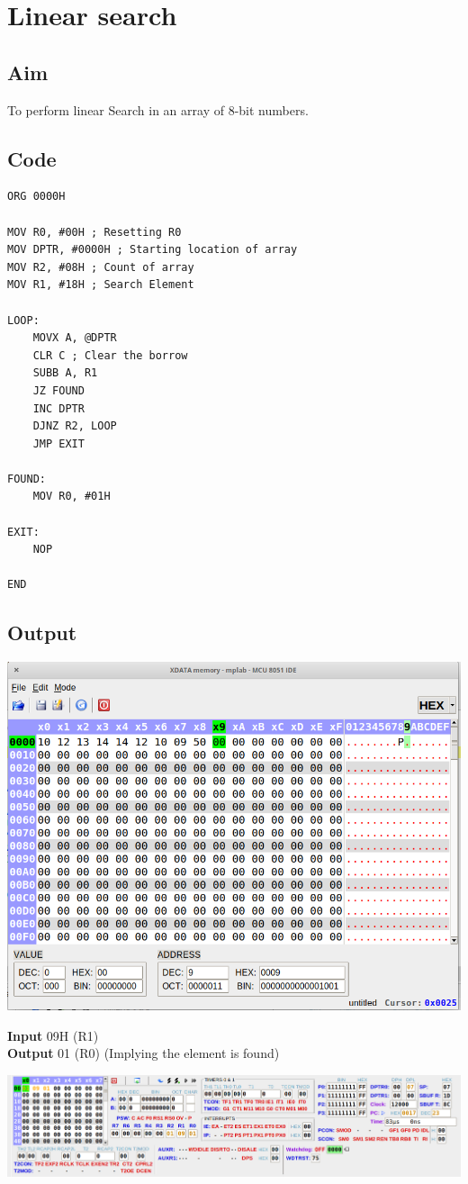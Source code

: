\section{Linear search}
\subsection{Aim}
To perform linear Search in an array of 8-bit numbers.

\subsection{Code}
\begin{lstlisting}
ORG 0000H

MOV R0, #00H ; Resetting R0
MOV DPTR, #0000H ; Starting location of array
MOV R2, #08H ; Count of array
MOV R1, #18H ; Search Element

LOOP:
	MOVX A, @DPTR
	CLR C ; Clear the borrow
	SUBB A, R1
	JZ FOUND
	INC DPTR
	DJNZ R2, LOOP
	JMP EXIT

FOUND:
	MOV R0, #01H

EXIT:
	NOP

END
\end{lstlisting}

\subsection{Output}
\begin{center}
	\includegraphics[width=\textwidth]{img/p26/ss1.png}
\end{center}
\textbf{Input} 09H (R1)\\
\textbf{Output} 01 (R0) (Implying the element is found)\\
\begin{center}
	\includegraphics[width=\textwidth]{img/p26/ss2.png}
\end{center}

